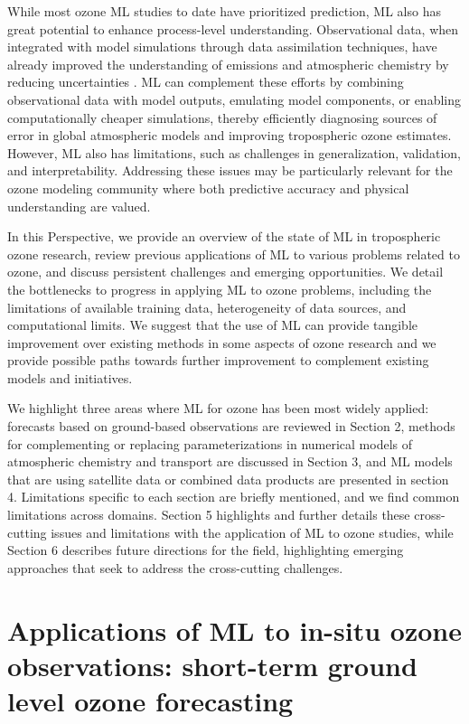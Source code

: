 \documentclass[gmd, manuscript]{copernicus}
\begin{document}
While most ozone ML studies to date have prioritized prediction, ML also has great potential to enhance process-level understanding. Observational data, when integrated with model simulations through data assimilation techniques, have already improved the understanding of emissions and atmospheric chemistry by reducing uncertainties \citep{miyazaki_evaluation_2020}. ML can complement these efforts by combining observational data with model outputs, emulating model components, or enabling computationally cheaper simulations, thereby efficiently diagnosing sources of error in global atmospheric models and improving tropospheric ozone estimates. 
However, ML also has limitations, such as challenges in generalization, validation, and interpretability. Addressing these issues may be particularly relevant for the ozone modeling community where both predictive accuracy and physical understanding are valued.
 
In this Perspective, we provide an overview of the state of ML in tropospheric ozone research, review previous applications of ML to various problems related to ozone, and discuss persistent challenges and emerging opportunities. We detail the bottlenecks to progress in applying ML to ozone problems, including the limitations of available training data, heterogeneity of data sources, and computational limits. We suggest that the use of ML can provide tangible improvement over existing methods in some aspects of ozone research and we provide possible paths towards further improvement to complement existing models and initiatives.

We highlight three areas where ML for ozone has been most widely applied: forecasts based on ground-based observations are reviewed in Section 2, methods for complementing or replacing parameterizations in numerical models of atmospheric chemistry and transport are discussed in Section 3, and ML models that are using satellite data or combined data products are presented in section 4. Limitations specific to each section are briefly mentioned, and we find common limitations across domains. Section 5 highlights and further details these cross-cutting issues and limitations with the application of ML to ozone studies, while Section 6 describes future directions for the field, highlighting emerging approaches that seek to address the cross-cutting challenges.




\section{Applications of ML to in-situ ozone observations: short-term ground level ozone forecasting}
\label{sec:tsforecast}
\end{document}
